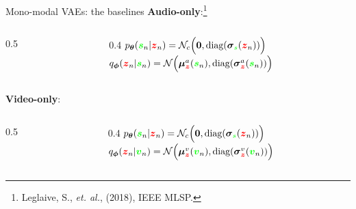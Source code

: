 \documentclass[aspectratio=169]{beamer}
\newcommand{\mylz}{{\color{red}z}}
\newcommand{\myos}{{\color{green}s}}
\newcommand{\myov}{{\color{green}v}}
\newcommand{\bs}[1]{\boldsymbol{#1}}
\begin{document}
\begin{frame}{Mono-modal VAEs: the baselines}
\textbf{Audio-only}:\footnote{Leglaive, S., \textit{et. al.}, (2018), IEEE MLSP.}\vspace{-1mm}
\begin{columns}
 \begin{column}{0.5\textwidth}
 \resizebox{\textwidth}{!}{}
 \end{column}
 \begin{column}{0.4\textwidth}
 \small
  $p_{\bs{\theta}}(\bs{\myos}_n | \bs{\mylz}_n)= \mathcal{N}_c\Big(\boldsymbol{0}, \text{diag}(\bs{\sigma}_{\myos}(\bs{\mylz}_n))\Big)$\\
  $q_{\bs{\phi}}(\bs{\mylz}_n|\bs{\myos}_n)= \mathcal{N}\Big(\bs{\mu}_{\bs{\mylz}}^a(\bs{\myos}_n), \text{diag}(\bs{\sigma}_{\bs{\mylz}}^a(\bs{\myos}_n))\Big)$
 \end{column}
\end{columns}
\pause
\textbf{Video-only}:
\vspace{-1mm}
\begin{columns}
 \begin{column}{0.5\textwidth}
  \resizebox{\textwidth}{!}{}
 \end{column}
 \begin{column}{0.4\textwidth}
 \small
  $p_{\bs{\theta}}(\bs{\myos}_n | \bs{\mylz}_n)= \mathcal{N}_c\Big(\boldsymbol{0}, \text{diag}(\bs{\sigma}_{\myos}(\bs{\mylz}_n))\Big)$\\
  $q_{\bs{\phi}}(\bs{\mylz}_n|\bs{\myov}_n)= \mathcal{N}\Big(\bs{\mu}_{\bs{\mylz}}^v(\bs{\myov}_n), \text{diag}(\bs{\sigma}_{\bs{\mylz}}^v(\bs{\myov}_n))\Big)$
 \end{column}
\end{columns}
\end{frame}
\end{document}
